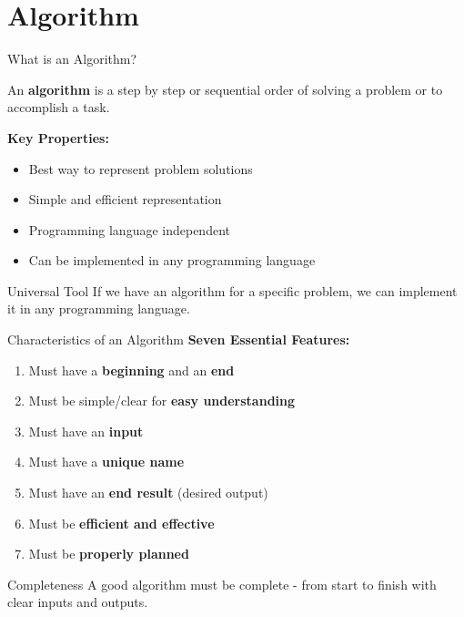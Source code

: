 \documentclass[aspectratio=169]{beamer}
\begin{document}
\section{Algorithm}

\begin{frame}{What is an Algorithm?}
    \begin{definition}
        An \textbf{algorithm} is a step by step or sequential order of solving a problem or to accomplish a task.
    \end{definition}
    
    \vspace{0.3cm}
    \textbf{Key Properties:}
    \begin{itemize}
        \item Best way to represent problem solutions
        \item Simple and efficient representation
        \item Programming language independent
        \item Can be implemented in any programming language
    \end{itemize}
    
    \vspace{0.2cm}
    \begin{exampleblock}{Universal Tool}
        If we have an algorithm for a specific problem, we can implement it in any programming language.
    \end{exampleblock}
\end{frame}

\begin{frame}{Characteristics of an Algorithm}
    \textbf{Seven Essential Features:}
    
    \begin{enumerate}
        \item   Must have a \textbf{beginning} and an \textbf{end}
        \item  Must be simple/clear for \textbf{easy understanding}
        \item  Must have an \textbf{input}
        \item  Must have a \textbf{unique name}
        \item  Must have an \textbf{end result} (desired output)
        \item  Must be \textbf{efficient and effective}
        \item   Must be \textbf{properly planned}
    \end{enumerate}
    
    \vspace{0.5cm}
    \begin{alertblock}{Completeness}
        A good algorithm must be complete - from start to finish with clear inputs and outputs.
    \end{alertblock}
\end{frame}
\end{document}
